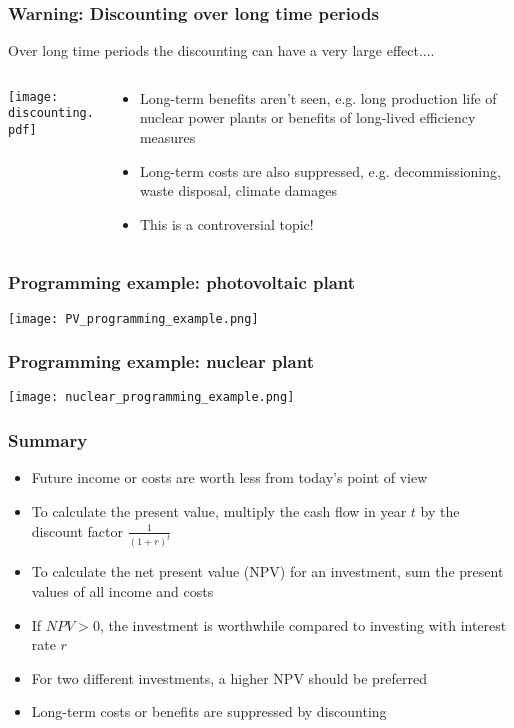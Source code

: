 \documentclass[10pt,aspectratio=169,dvipsnames]{beamer}
\let\olditem\item
\renewcommand{\item}{%
\olditem\vspace{5pt}}
\begin{document}
\begin{frame}
  \frametitle{Warning: Discounting over long time periods}

  Over long time periods the discounting can have a very large effect....

  \begin{columns}[T]
\begin{column}{9cm}
  \centering
  \texttt{[image: discounting.pdf]}
\end{column}
\begin{column}{5cm}
  \begin{itemize}
  \item Long-term benefits aren't seen, e.g. long production life of nuclear power plants or benefits of long-lived efficiency measures
  \item Long-term costs are also suppressed, e.g. decommissioning, waste disposal, climate damages
  \item This is a \alert{controversial topic!}
  \end{itemize}
\end{column}
  \end{columns}

\end{frame}



\begin{frame}
  \frametitle{Programming example: photovoltaic plant}

  \centering
  \texttt{[image: PV\_programming\_example.png]}


\end{frame}

\begin{frame}
  \frametitle{Programming example: nuclear plant}

  \centering
  \texttt{[image: nuclear\_programming\_example.png]}


\end{frame}




\begin{frame}
  \frametitle{Summary}

  \begin{itemize}
  \item Future income or costs are worth less from today's point of view
  \item To calculate the \alert{present value}, multiply the cash flow in year $t$ by the \alert{discount factor}  $\frac{1}{(1+r)^t}$
  \item To calculate the \alert{net present value (NPV)} for an investment, sum the present values of all income and costs
  \item If  $NPV > 0$, the investment is worthwhile compared to investing with interest rate $r$
  \item For two different investments, a higher NPV should be preferred
  \item \alert{Long-term} costs or benefits are \alert{suppressed} by discounting
  \end{itemize}

\end{frame}
\end{document}
